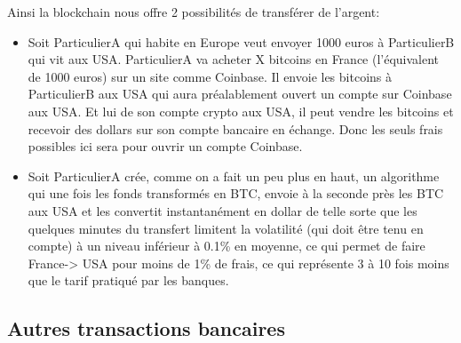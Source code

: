 \documentclass[12pt]{report}
\begin{document}
\hspace{1cm} Ainsi la blockchain nous offre 2 possibilités de transférer de l'argent:
\begin{itemize} 
    \item Soit ParticulierA qui habite en Europe veut envoyer 1000 euros à ParticulierB qui vit aux USA. ParticulierA va acheter X bitcoins en France (l’équivalent de 1000 euros) sur un site comme Coinbase. Il envoie les bitcoins à ParticulierB aux USA qui aura préalablement ouvert un compte sur Coinbase aux USA. Et lui de son compte crypto aux USA, il peut vendre les bitcoins et recevoir des dollars sur son compte bancaire en échange. Donc les seuls frais possibles ici sera pour ouvrir un compte Coinbase.
    
    \item Soit ParticulierA crée, comme on a fait un peu plus en haut, un algorithme qui une fois les fonds transformés en BTC, envoie à la seconde près les BTC aux USA et les convertit instantanément en dollar de telle sorte que les quelques minutes du transfert limitent la volatilité (qui doit être tenu en compte) à un niveau inférieur à 0.1\% en moyenne, ce qui permet de faire France-> USA pour moins de 1\% de frais, ce qui représente 3 à 10 fois moins que le tarif pratiqué par les banques.
\end{itemize}



    \subsection{Autres transactions bancaires}
    
\end{document}
